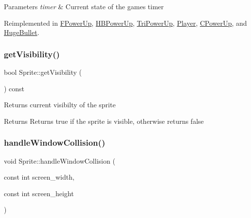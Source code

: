 \begin{DoxyParams}{Parameters}
{\em timer} & Current state of the games timer \\
\hline
\end{DoxyParams}


Reimplemented in \hyperlink{classFPowerUp_aaf83782b032f53dacd37650127595148}{F\+Power\+Up}, \hyperlink{classHBPowerUp_ac9fcb7d3ef5f3a0561ffe0b6689944a1}{H\+B\+Power\+Up}, \hyperlink{classTriPowerUp_a06af18b739589c56a90da91716243acf}{Tri\+Power\+Up}, \hyperlink{classPlayer_a856a5c64a431661946ba01b84c969289}{Player}, \hyperlink{classCPowerUp_af1e0bad769efcde21858144596212e01}{C\+Power\+Up}, and \hyperlink{classHugeBullet_a0c4f11d7d892b683ecf601cdc37c6ebf}{Huge\+Bullet}.

\mbox{\label{classSprite_a47ac98fad52841eb22a62f6854f66e1f}} 
\subsubsection{\texorpdfstring{get\+Visibility()}{getVisibility()}}
{\footnotesize\ttfamily bool Sprite\+::get\+Visibility (\begin{DoxyParamCaption}{ }\end{DoxyParamCaption}) const}

Returns current visibilty of the sprite

\begin{DoxyReturn}{Returns}
Returns true if the sprite is visible, otherwise returns false 
\end{DoxyReturn}
\mbox{\label{classSprite_a88935cd050a81898ee3a5693038f1a7a}} 
\subsubsection{\texorpdfstring{handle\+Window\+Collision()}{handleWindowCollision()}}
{\footnotesize\ttfamily void Sprite\+::handle\+Window\+Collision (\begin{DoxyParamCaption}\item[{const int}]{screen\+\_\+width,  }\item[{const int}]{screen\+\_\+height }\end{DoxyParamCaption})\hspace{0.3cm}{\ttfamily [virtual]}}

